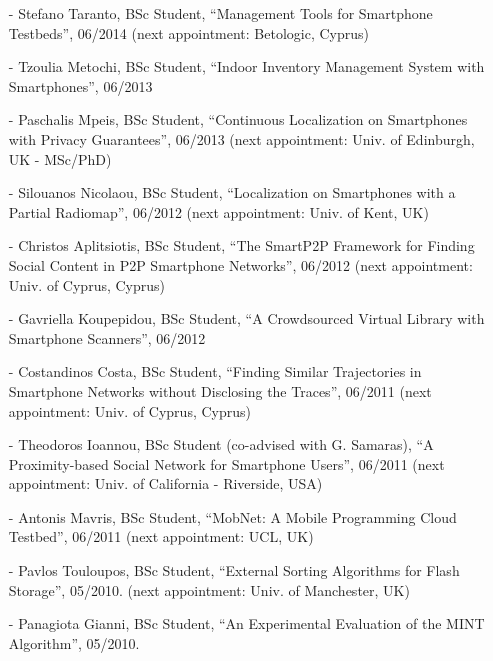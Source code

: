 \documentclass[10pt]{article}
\begin{document}
\begin{itemize}
\begin{itemize}
         \item[-] Stefano Taranto, BSc Student, ``Management Tools for Smartphone Testbeds'',  06/2014 (next appointment: Betologic, Cyprus)
			\item[-] Tzoulia Metochi, BSc Student, ``Indoor Inventory Management System with Smartphones'',  06/2013  %
			\item[-] Paschalis Mpeis, BSc Student, ``Continuous Localization on Smartphones with Privacy Guarantees'',  06/2013 (next appointment: Univ. of Edinburgh, UK - MSc/PhD)  %
			\item[-] Silouanos Nicolaou, BSc Student, ``Localization on Smartphones with a Partial Radiomap'', 06/2012 (next appointment: Univ. of Kent, UK)  %
			\item[-] Christos Aplitsiotis, BSc Student, ``The SmartP2P Framework for Finding Social Content in P2P Smartphone Networks'', 06/2012 (next appointment: Univ. of Cyprus, Cyprus)  %
			\item[-] Gavriella Koupepidou, BSc Student, ``A Crowdsourced Virtual Library with Smartphone Scanners'', 06/2012  %
			\item[-] Costandinos Costa, BSc Student, ``Finding Similar Trajectories in Smartphone Networks without Disclosing the Traces'', 06/2011 (next appointment: Univ. of Cyprus, Cyprus)  %
 			\item[-] Theodoros Ioannou, BSc Student (co-advised with G. Samaras), ``A Proximity-based Social Network for Smartphone Users'', 06/2011 (next appointment: Univ. of California - Riverside, USA)     %
            \item[-] Antonis Mavris, BSc Student, ``MobNet: A Mobile Programming Cloud Testbed'', 06/2011 (next appointment: UCL, UK) %
			\item[-] Pavlos Touloupos, BSc Student, ``External Sorting Algorithms for Flash Storage'', 05/2010. (next appointment: Univ. of Manchester, UK)%
			\item[-] Panagiota Gianni, BSc Student, ``An Experimental Evaluation of the MINT Algorithm'', 05/2010.	%
	\end{itemize}


\end{itemize}
\end{document}
